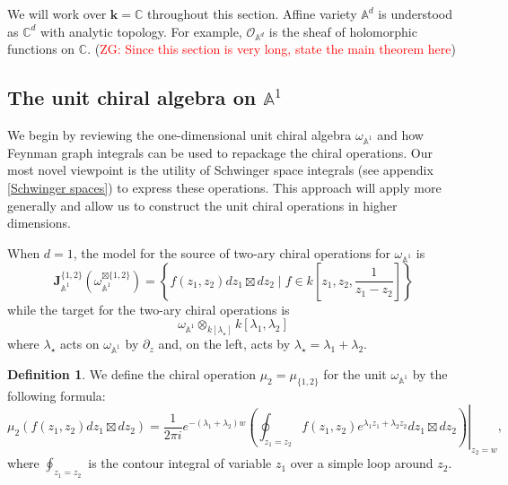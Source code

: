 \documentclass[11pt]{amsart}
\theoremstyle{definition}
\newtheorem{defn}[thm]{Definition}
\theoremstyle{remark}
\numberwithin{equation}{section}
\renewcommand{\AA}{\mathbb{A}}
\newcommand{\del}{\partial}
\newcommand{\Gui}[1]{(\textcolor{red}{ZG: #1})}
\begin{document}
We will work over $\mathbf{k}=\mathbb{C}$ throughout this section. Affine variety $\mathbb{A}^d$ is understood as $\mathbb{C}^d$ with analytic topology. For example, $\mathcal{O}_{\mathbb{A}^d}$ is the sheaf of holomorphic functions on $\mathbb{C}$.
\Gui{Since this section is very long, state the main theorem here}

\subsection{The unit chiral algebra on $\mathbb{A}^1$} \label{s:feynman1d}
We begin by reviewing the one-dimensional unit chiral algebra $\omega_{\mathbb{A}^1}$ and how Feynman graph integrals
can be used to repackage the chiral operations.
Our most novel viewpoint is the utility of Schwinger space integrals (see appendix \ref{Schwinger spaces}) to express
these operations.
This approach will apply more generally and allow us to construct the unit chiral operations in higher dimensions.

When $d=1$, the model for the source of two-ary chiral operations for $\omega_{\AA^1}$ is
$$
\mathbf{J}_{\mathbb{A}^1}^{\{1,2\}}(\omega_{\mathbb{A}^1}^{\boxtimes\{1,2\}})=\left\{f(z_{1},z_{2})dz_{1}\boxtimes dz_{2} \; | \; f\in k\left[z_{1},z_{2},\frac{1}{z_{1}-z_{2}}\right]\right\}
$$
while the target for the two-ary chiral operations is
\begin{equation}\label{}
  \omega_{\mathbb{A}^1} \otimes_{k[\lambda_\star]} k[\lambda_1,\lambda_2]
\end{equation}
where $\lambda_\star$ acts on $\omega_{\AA^1}$ by $\del_z$ and, on the left, acts by $\lambda_\star = \lambda_1 +
\lambda_2$.
\begin{defn}
  We define the chiral operation $\mu_2 = \mu_{\{1,2\}}$ for the unit $\omega_{\mathbb{A}^1}$ by the following formula:
    $$
    \mu_2(f(z_{1},z_{2})dz_{1}\boxtimes dz_{2})=\frac{1}{2\pi i}e^{-(\lambda_{1}+\lambda_{2})w}\left. \left(\oint_{z_{1}=z_2}f(z_{1},z_{2})e^{\lambda_{1}z_{1}+\lambda_{2}z_{2}}dz_{1}\boxtimes dz_{2}\right)\right|_{z_{2}=w},
    $$
    where $\oint_{z_{1}=z_{2}}$ is the contour integral of variable $z_{1}$ over a simple loop around $z_{2}$.
  \end{defn}
\end{document}
